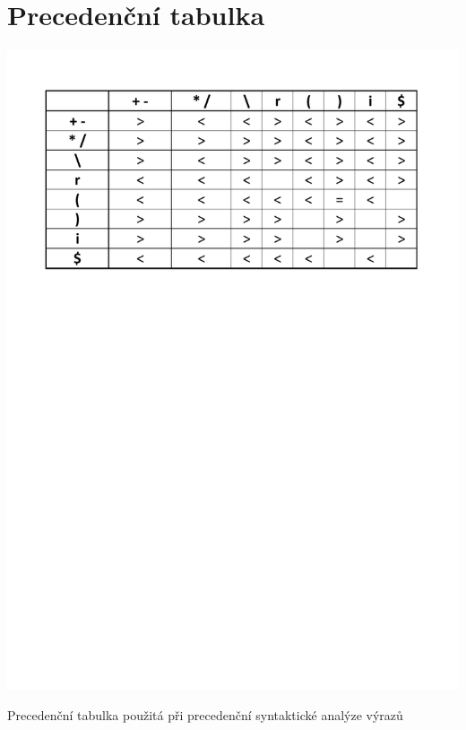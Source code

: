 \documentclass[a4paper, 11pt]{article}
\begin{document}
	\section{Precedenční tabulka}

	\begin{table}[!ht]
		\centering
		\includegraphics[width=0.7\linewidth]{inc/prec_table.pdf}
		\caption{Precedenční tabulka použitá při precedenční syntaktické analýze výrazů}
		\label{table:prec_table}
	\end{table}
\end{document}
